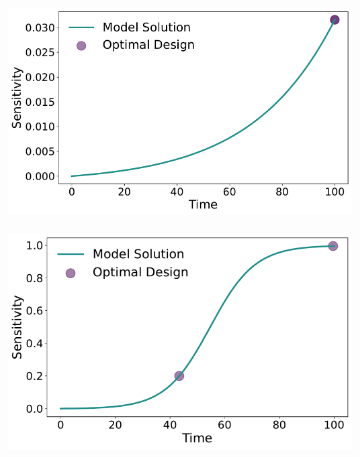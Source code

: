 \documentclass[10pt,A4paper]{article}
\begin{document}
\begin{figure}[H]
    \begin{subfigure}{.5\textwidth}
      \centering
      \includegraphics[scale=0.255]{Figures/Sensitivity_Results_baranyi_roberts_ode_fisher_determinant_rel_sensit_cont_2times_2temps_000_x_00_p_00.pdf}
    \end{subfigure}
    \begin{subfigure}{.5\textwidth}
        \centering
        \includegraphics[scale=0.255]{Figures/Sensitivity_Results_baranyi_roberts_ode_fisher_determinant_rel_sensit_cont_2times_2temps_001_x_00_p_00.pdf}
    \end{subfigure}
    \begin{subfigure}{.5\textwidth}
      \centering

\end{subfigure}
\end{figure}
\end{document}
